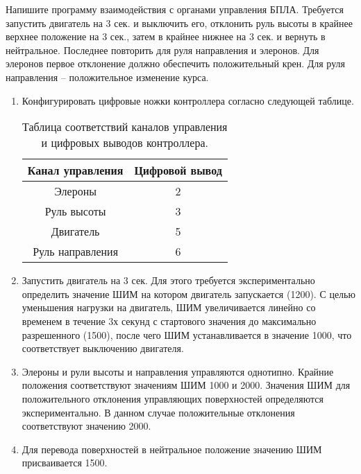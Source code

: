 
Напишите программу взаимодействия с органами управления БПЛА. Требуется запустить двигатель на 3 сек. и выключить его, отклонить руль высоты в крайнее верхнее положение на 3 сек., затем в крайнее нижнее на 3 сек. и вернуть в нейтральное. Последнее повторить для руля направления и элеронов. Для элеронов первое отклонение должно обеспечить положительный крен. Для руля направления – положительное изменение курса.

\solutionSection 

\begin{enumerate}
    \item Конфигурировать цифровые ножки контроллера согласно следующей таблице.
    \begin{table}[H]
        \center
        \caption{Таблица соответствий каналов управления и цифровых выводов контроллера.}
        \begin{tabular}{|c|c|}
            \hline
            Канал управления&	Цифровой вывод\\
            \hline
            Элероны&	2\\
            \hline
            Руль высоты&	3\\
            \hline
            Двигатель&	5\\
            \hline
            Руль направления&	6\\
            \hline
        \end{tabular}
    \end{table}
    \item Запустить двигатель на 3 сек. Для этого требуется экспериментально определить значение ШИМ на котором двигатель запускается (1200). С целью уменьшения нагрузки на двигатель, ШИМ увеличивается линейно со временем в течение 3х секунд с стартового значения до максимально разрешенного (1500), после чего ШИМ устанавливается в значение 1000, что соответствует выключению двигателя.
    \item Элероны и рули высоты и направления управляются однотипно. Крайние положения соответствуют значениям ШИМ 1000 и 2000. Значения ШИМ для положительного отклонения управляющих поверхностей определяются экспериментально. В данном случае положительные отклонения соответствуют значению 2000. 
    \item Для перевода поверхностей в нейтральное положение значению ШИМ присваивается 1500.
\end{enumerate}

